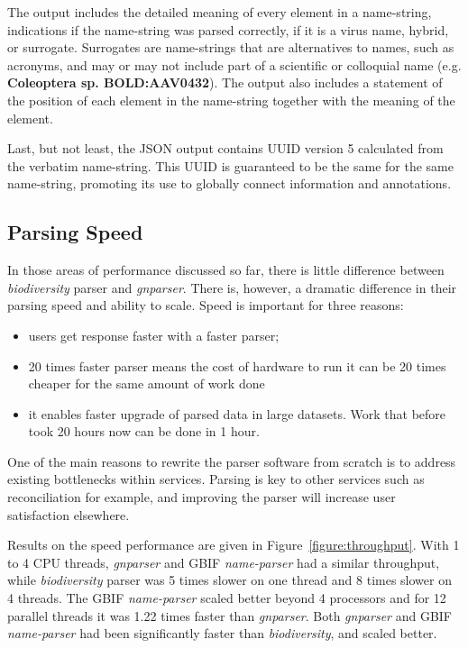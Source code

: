 \documentclass{bmcart}
\begin{document}
The output includes the detailed meaning of every element in a name-string,
indications if the name-string was parsed correctly, if it is a virus name,
hybrid, or surrogate. Surrogates are name-strings that are alternatives to
names, such as acronyms, and may or may not include part of a scientific or
colloquial name (e.g. \textbf{Coleoptera sp. BOLD:AAV0432}). The output also
includes a statement of the position of each element in the name-string
together with the meaning of the element.

Last, but not least, the JSON output contains UUID version 5 calculated from
the verbatim name-string. This UUID is guaranteed to be the same for the same
name-string, promoting its use to globally connect information and annotations.

\subsection*{Parsing Speed}

In those areas of performance discussed so far, there is little difference
between \textit{biodiversity} parser and \textit{gnparser}. There is, however,
a dramatic difference in their parsing speed and ability to scale. Speed is
important for three reasons:


\begin{itemize}

  \item users get response faster with a faster parser;

  \item 20 times faster parser means the cost of hardware to run it can be
    20 times cheaper for the same amount of work done

  \item it enables faster upgrade of parsed data in large datasets. Work that
    before took 20 hours now can be done in 1 hour.

\end{itemize}

One of the main reasons to rewrite the parser software from scratch is to
address existing bottlenecks within services. Parsing is key to other services
such as reconciliation for example, and improving the parser will increase user
satisfaction elsewhere.

Results on the speed performance are given in Figure~\ref{figure:throughput}.
With 1 to 4 CPU threads, \textit{gnparser} and GBIF \textit{name-parser} had a
similar throughput, while \textit{biodiversity} parser was 5 times slower on
one thread and  8 times slower on 4 threads. The GBIF \textit{name-parser}
scaled better beyond 4 processors and for 12 parallel threads it was 1.22 times
faster than \textit{gnparser}.  Both \textit{gnparser} and GBIF
\textit{name-parser} had been significantly faster than \textit{biodiversity},
and scaled better.
\end{document}
